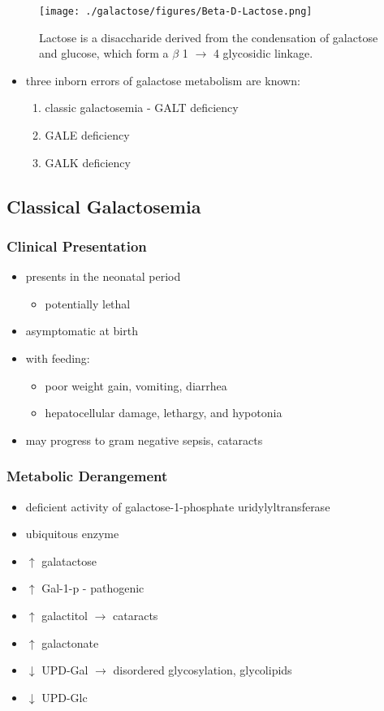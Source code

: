 \documentclass{scrartcl}
\begin{document}
\begin{figure}[htbp]
\centering
\texttt{[image: ./galactose/figures/Beta-D-Lactose.png]}
\caption[lactose]{\label{fig:org43c17b2}
Lactose is a disaccharide derived from the condensation of galactose and glucose, which form a \(\beta\) 1 \(\to\) 4 glycosidic linkage.}
\end{figure}

\begin{itemize}
\item three inborn errors of galactose metabolism are known:
\begin{enumerate}
\item classic galactosemia - GALT deficiency
\item GALE deficiency
\item GALK deficiency
\end{enumerate}
\end{itemize}

\subsection{Classical Galactosemia}
\label{sec:orgffe134a}
\subsubsection{Clinical Presentation}
\label{sec:orgfd1d0e6}
\begin{itemize}
\item presents in the neonatal period
\begin{itemize}
\item potentially lethal
\end{itemize}
\item asymptomatic at birth
\item with feeding:
\begin{itemize}
\item poor weight gain, vomiting, diarrhea
\item hepatocellular damage, lethargy, and hypotonia
\end{itemize}
\item may progress to gram negative sepsis, cataracts
\end{itemize}

\subsubsection{Metabolic Derangement}
\label{sec:org83d5f66}
\begin{itemize}
\item deficient activity of galactose-1-phosphate uridylyltransferase
\item ubiquitous enzyme
\item \(\uparrow\)  galatactose
\item \(\uparrow\) Gal-1-p - pathogenic
\item \(\uparrow\)  galactitol \(\to\) cataracts
\item \(\uparrow\) galactonate
\item \(\downarrow\) UPD-Gal \(\to\) disordered glycosylation, glycolipids
\item \(\downarrow\) UPD-Glc
\end{itemize}
\end{document}
